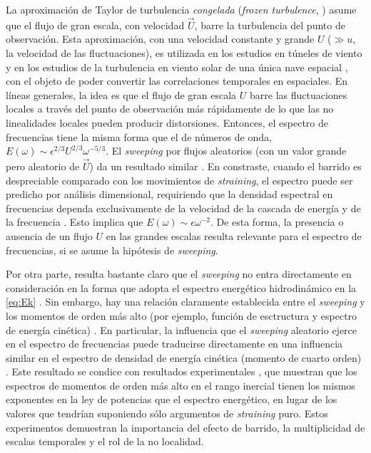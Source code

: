 La aproximación de Taylor de turbulencia \textit{congelada}
(\textit{frozen turbulence}, \cite{taylor_spectrum_1938}) asume que el
flujo de gran escala, con velocidad $\vec{U}$, barre la turbulencia
del punto de observación. Esta aproximación, con una velocidad
constante y grande $U$ ($\gg u$, la velocidad de las fluctuaciones),
es utilizada en los estudios en túneles de viento y en los estudios de
la turbulencia en viento solar de una única nave espacial
\cite{jokipii_turbulence_1973}, con el objeto de poder convertir las
correlaciones temporales en espaciales. En líneas generales, la idea
es que el flujo de gran escala $U$ barre las fluctuaciones locales a
través del punto de observación más rápidamente de lo que las no
linealidades locales pueden producir distorsiones. Entonces, el
espectro de frecuencias tiene la misma forma que el de números de
onda, $E(\omega) \sim \epsilon^{2/3} U^{2/3} \omega ^{-5/3}$. El
\textit{sweeping} por flujos aleatorios (con un valor grande pero
aleatorio de $\vec{U}$) da un resultado similar
\cite{tennekes_eulerian_1975, chen_sweeping_1989}. En constraste,
cuando el barrido es despreciable comparado con los movimientos de
\textit{straining}, el espectro puede ser predicho por análisis
dimensional, requiriendo que la densidad espectral en frecuencias
dependa exclusivamente de la velocidad de la cascada de energía y de
la frecuencia \cite{tennekes_eulerian_1975, nelkin_time_1990}. Esto
implica que $E(\omega) \sim \epsilon \omega^{-2}$. De esta forma, la
presencia o ausencia de un flujo $U$ en las grandes escalas resulta
relevante para el espectro de frecuencias, si se asume la hipótesis de
\textit{sweeping}.

Por otra parte, resulta bastante claro que el \textit{sweeping} no
entra directamente en consideración en la forma que adopta el espectro
energético hidrodinámico en la \cref{eq:Ek}
\cite{chapman_computational_1979}. Sin embargo, hay una relación
claramente establecida entre el \textit{sweeping} y los momentos de
orden más alto (por ejemplo, función de esctructura y espectro de
energía cinética) \cite{nelkin_time_1990}. En particular, la
influencia que el \textit{sweeping} aleatorio ejerce en el espectro de
frecuencias puede traducirse directamente en una influencia similar en
el espectro de densidad de energía cinética (momento de cuarto orden)
\cite{chen_sweeping_1989}. Este resultado se condice con resultados
experimentales \cite{van_atta_higher-order_1975,
  zhou_non-gaussian_1993}, que muestran que los espectros de momentos
de orden más alto en el rango inercial tienen los mismos exponentes en
la ley de potencias que el espectro energético, en lugar de los
valores que tendrían suponiendo sólo argumentos de \textit{straining}
puro. Estos experimentos demuestran la importancia del efecto de
barrido, la multiplicidad de escalas temporales y el rol de la no
localidad.

